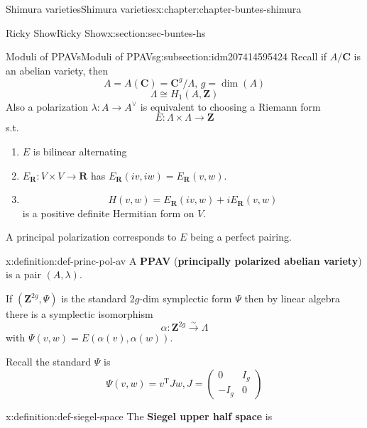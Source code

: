 \documentclass[oneside,10pt,]{book}
\newcommand{\terminology}[1]{\textbf{#1}}
\numberwithin{equation}{section}
\newcommand{\ZZ}{\mathbf{Z}}
\newcommand{\RR}{\mathbf{R}}
\newcommand{\CC}{\mathbf{C}}
\newcommand{\transpose}{\mathrm{T}}
\newcommand{\amp}{&}
\begin{document}
\begin{chapterptx}{Shimura varieties}{}{Shimura varieties}{}{}{x:chapter:chapter-buntes-shimura}
\begin{sectionptx}{Ricky Show}{}{Ricky Show}{}{}{x:section:sec-buntes-hs}
\typeout{************************************************}
%
\begin{subsectionptx}{Moduli of PPAVs}{}{Moduli of PPAVs}{}{}{g:subsection:idm207414595424}
Recall if \(A/ \CC\) is an abelian variety,  then%
\begin{equation*}
A = A(\CC) =  \CC^g/ \Lambda, \,g = \dim (A)
\end{equation*}
%
\begin{equation*}
\Lambda \cong H_1(A,\ZZ)
\end{equation*}
Also a polarization \(\lambda \colon A \to A^\vee\) is equivalent to choosing a Riemann form%
\begin{equation*}
E \colon \Lambda \times \Lambda \to \ZZ
\end{equation*}
s.t.%
\begin{enumerate}
\item{}\(E\) is bilinear alternating%
\item{}\(E_\RR \colon V\times V \to \RR\) has \(E_\RR(iv,iw)  = E_\RR( v,w)\).%
\item{}%
\begin{equation*}
H(v,w) = E_\RR(iv, w) + i E_\RR(v,w)
\end{equation*}
is a positive definite Hermitian form on \(V\).%
\end{enumerate}
A principal polarization corresponds to \(E\) being a perfect pairing.%
\begin{definition}{}{x:definition:def-princ-pol-av}%
A \terminology{PPAV} (\terminology{principally polarized abelian variety}) is a pair \((A,\lambda)\).%
\end{definition}
If \((\ZZ^{2g}, \Psi)\) is the standard \(2g\)-dim symplectic form \(\Psi\) then by linear algebra there is a symplectic isomorphism%
\begin{equation*}
\alpha \colon \ZZ^{2g} \xrightarrow\sim \Lambda
\end{equation*}
with \(\Psi(v,w) = E(\alpha(v), \alpha(w))\).%
\par
Recall the standard \(\Psi\) is%
\begin{equation*}
\Psi (v,w) = v^\transpose J w, J = \begin{pmatrix} 0 \amp I_g \\ -I_g \amp 0\end{pmatrix}
\end{equation*}
%
\begin{definition}{}{x:definition:def-siegel-space}%
The \terminology{Siegel upper half space} is%

\end{definition}
\end{subsectionptx}
\end{sectionptx}
\end{chapterptx}
\end{document}
